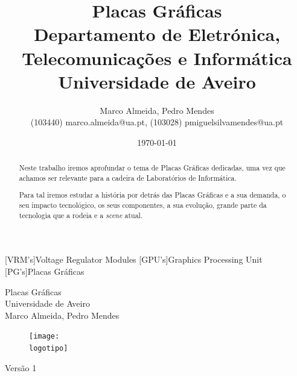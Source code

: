 \documentclass{report}
\begin{document}
%
[VRM's]{Voltage Regulator Modules}
[GPU's]{Graphics Processing Unit}
[PG's]{Placas Gráficas}
\def\titulo{Placas Gráficas}
\def\data{\today}
\def\autores{Marco Almeida, Pedro Mendes}
\def\autorescontactos{(103440) marco.almeida@ua.pt, (103028) pmiguelsilvamendes@ua.pt}
\def\versao{Versão 1}
\def\departamento{Departamento de Eletrónica, Telecomunicações e Informática}
\def\empresa{Universidade de Aveiro}
\def\logotipo{ua.pdf}
%
%
\renewcommand{\contentsname}{Índice}
\begin{titlepage}

\begin{center}
%
\vspace*{50mm}
%
{\Huge \titulo}\\ 
%
\vspace{10mm}
%
{\Large \empresa}\\
%
\vspace{10mm}
%
{\LARGE \autores}\\ 
%
\vspace{30mm}
%
\begin{figure}[h]
\center
\texttt{[image: \\logotipo]}
\end{figure}
%
\vspace{30mm}
\end{center}
%
\begin{flushright}
\versao
\end{flushright}
\end{titlepage}

\title{%
{\Huge\textbf{\titulo}}\\
{\Large \departamento\\ \empresa}
}
%
\author{%
    \autores \\
    \autorescontactos
}
%
\date{\data}
%
\maketitle


\begin{abstract}
Neste trabalho iremos aprofundar o tema de Placas Gráficas dedicadas, uma vez que achamos ser relevante para a cadeira de Laboratórios de Informática.

Para tal iremos estudar a história por detrás das Placas Gráficas e a sua demanda, o seu impacto tecnológico, os seus componentes, a sua evolução, grande parte da tecnologia que a rodeia e a \textit{scene} atual. 
\end{abstract}
\end{document}
